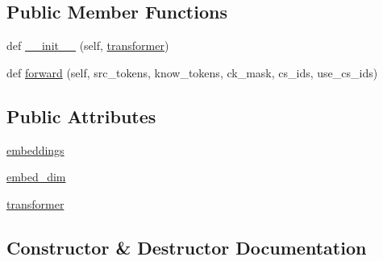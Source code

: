 \subsection*{Public Member Functions}
\begin{DoxyCompactItemize}
\item 
def \hyperlink{classprojects_1_1wizard__of__wikipedia_1_1generator_1_1modules_1_1ContextKnowledgeEncoder_a30bdd85c8d48f70f1c903e0832f618f8}{\+\_\+\+\_\+init\+\_\+\+\_\+} (self, \hyperlink{classprojects_1_1wizard__of__wikipedia_1_1generator_1_1modules_1_1ContextKnowledgeEncoder_aaf8e62c67b68634bd0e3ea1be88b7a6c}{transformer})
\item 
def \hyperlink{classprojects_1_1wizard__of__wikipedia_1_1generator_1_1modules_1_1ContextKnowledgeEncoder_a482a0f0798408978ba2902159517d84b}{forward} (self, src\+\_\+tokens, know\+\_\+tokens, ck\+\_\+mask, cs\+\_\+ids, use\+\_\+cs\+\_\+ids)
\end{DoxyCompactItemize}
\subsection*{Public Attributes}
\begin{DoxyCompactItemize}
\item 
\hyperlink{classprojects_1_1wizard__of__wikipedia_1_1generator_1_1modules_1_1ContextKnowledgeEncoder_aa1c8bdeb31ac36e8ce13856fb6c47006}{embeddings}
\item 
\hyperlink{classprojects_1_1wizard__of__wikipedia_1_1generator_1_1modules_1_1ContextKnowledgeEncoder_af06900dbcf4bcd72ed923dbe8930b0e0}{embed\+\_\+dim}
\item 
\hyperlink{classprojects_1_1wizard__of__wikipedia_1_1generator_1_1modules_1_1ContextKnowledgeEncoder_aaf8e62c67b68634bd0e3ea1be88b7a6c}{transformer}
\end{DoxyCompactItemize}


\subsection{Constructor \& Destructor Documentation}
\mbox{\label{classprojects_1_1wizard__of__wikipedia_1_1generator_1_1modules_1_1ContextKnowledgeEncoder_a30bdd85c8d48f70f1c903e0832f618f8}} 
